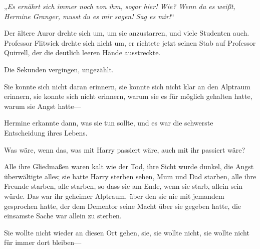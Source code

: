 „\emph{Es ernährt sich immer noch von ihm, sogar hier! Wie? Wenn du es weißt, Hermine Granger, musst du es mir sagen! Sag es mir!}“

Der ältere Auror drehte sich um, um sie anzustarren, und viele Studenten auch. Professor Flitwick drehte sich nicht um, er richtete jetzt seinen Stab auf Professor Quirrell, der die deutlich leeren Hände ausstreckte.

Die Sekunden vergingen, ungezählt.

Sie konnte sich nicht daran erinnern, sie konnte sich nicht klar an den Alptraum erinnern, sie konnte sich nicht erinnern, warum sie es für möglich gehalten hatte, warum sie Angst hatte—

Hermine erkannte dann, was sie tun sollte, und es war die schwerste Entscheidung ihres Lebens.

Was wäre, wenn das, was mit Harry passiert wäre, auch mit ihr passiert wäre?

Alle ihre Gliedmaßen waren kalt wie der Tod, ihre Sicht wurde dunkel, die Angst überwältigte alles; sie hatte Harry sterben sehen, Mum und Dad starben, alle ihre Freunde starben, alle starben, so dass sie am Ende, wenn sie starb, allein sein würde. Das war ihr geheimer Alptraum, über den sie nie mit jemandem gesprochen hatte, der dem Dementor seine Macht über sie gegeben hatte, die einsamste Sache war allein zu sterben.

Sie wollte nicht wieder an diesen Ort gehen, sie, sie wollte nicht, sie wollte nicht für immer dort bleiben—

